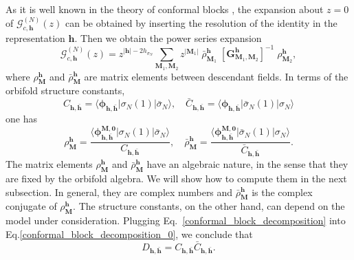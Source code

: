 \documentclass[a4paper,11pt]{article}
\begin{document}
As it is well known in the theory of conformal blocks \cite{DiFrancesco}, the expansion about $z=0$ of $\mathcal{G}_{c, \boldsymbol{h}}^{(N)}(z)$ can be obtained by inserting the resolution of the identity in the representation $\boldsymbol{h}$. Then we obtain the power series expansion
\begin{equation}\label{conformal_block_decomposition}
 \mathcal{G}_{c,\boldsymbol{h}}^{(N)}(z)=
 z^{|\boldsymbol{h}|-2h_{\sigma_N}}\sum_{\boldsymbol{M}_1, \boldsymbol{M}_2} z^{|\boldsymbol{M}_1|}\;\bar{\rho}^{\boldsymbol{h}}_{\boldsymbol{M}_1}\; [\boldsymbol{G}^{\boldsymbol{h}}_{\boldsymbol{M}_1,\boldsymbol{M}_2}]^{-1}\;\rho^{\boldsymbol{h}}_{\boldsymbol{M}_2},
\end{equation}
where $\rho_{\boldsymbol{M}}^{\boldsymbol{h}}$ and $\bar{\rho}^{\boldsymbol{h}}_{\boldsymbol{M}}$ are matrix elements between descendant fields. In terms of the orbifold structure constants,
\begin{equation}
\label{strucconst}
C_{\boldsymbol{h},\boldsymbol{\bar{h}}}=\langle \boldsymbol{\phi}_{\boldsymbol{h},\boldsymbol{\bar{h}}}| \sigma_{N}(1)|\bar{\sigma}_N\rangle, \quad 
\bar{C}_{\boldsymbol{h}, \boldsymbol{\bar{h}}}=\langle \boldsymbol{\phi}_{\boldsymbol{h}, \boldsymbol{\bar{h}}}|\bar{\sigma}_N(1)|\sigma_N\rangle
\end{equation}
one has
 \begin{equation}
 \label{Gammas}
\rho^{\boldsymbol{h}}_{\boldsymbol{M}} = \frac{\langle \boldsymbol{\phi}^{\boldsymbol{M},\boldsymbol{0}}_{\boldsymbol{h},\boldsymbol{\bar{h}}}| \sigma_{N}(1)|\bar{\sigma}_{N}\rangle}{C_{\boldsymbol{h},\boldsymbol{\bar{h}}}},\quad  
\bar{\rho}^{\boldsymbol{h}}_{\boldsymbol{M}} = \frac{\langle\boldsymbol{\phi}_{\boldsymbol{h}, \boldsymbol{\bar{h}}}^{\boldsymbol{M}, \boldsymbol{0}}|\bar{\sigma}_{N}(1)|\sigma_N\rangle}{\bar{C}_{\boldsymbol{h},\boldsymbol{\bar{h}}}} .
 \end{equation}
 The matrix elements  $\rho^{\boldsymbol{h}}_{\boldsymbol{M}}$ and $\bar{\rho}^{\boldsymbol{h}}_{\boldsymbol{M}}$ have an algebraic nature, in the sense that they are fixed by the orbifold algebra. We will show how to compute them in the next subsection. In general, they are complex 
 numbers and $\bar{\rho}_{\boldsymbol{M}}^{\boldsymbol{h}}$ is the complex conjugate of $\rho_{\boldsymbol{M}}^{\boldsymbol{h}}$.
 The structure constants, on the other hand, can depend on the model under consideration. Plugging Eq.~\eqref{conformal_block_decomposition} into Eq.\eqref{conformal_block_decomposition_0}, we conclude that 
 \begin{equation}\label{DC}
 D_{\boldsymbol{h},\boldsymbol{\bar{h}}}= C_{\boldsymbol{h},\boldsymbol{\bar{h}}}\bar{C}_{\boldsymbol{h}, \boldsymbol{\bar{h}}}.
 \end{equation}
\end{document}

